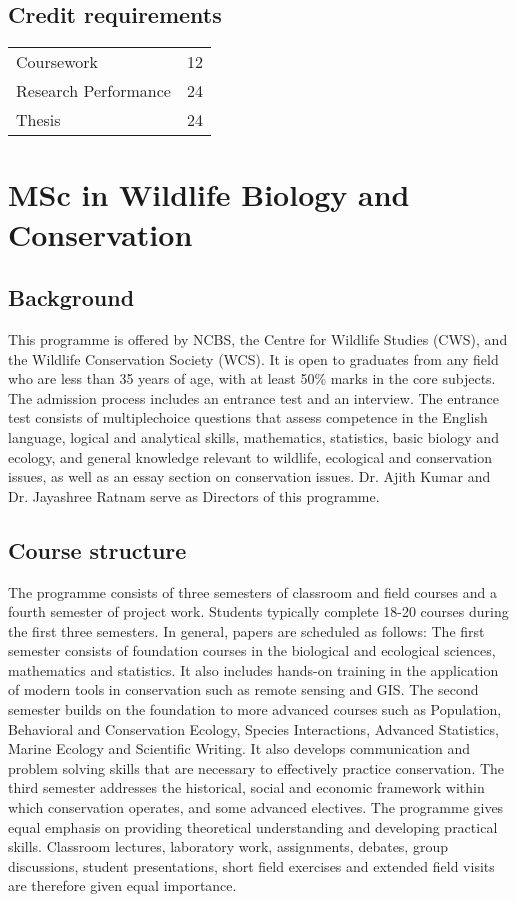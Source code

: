 \documentclass[a4paper,10pt]{article}
\begin{document}
\subsection{Credit requirements}
\begin{tabular}{l c}
    Coursework & 12 \\
    Research Performance & 24  \\
    Thesis & 24  \\
\end{tabular}

\section{MSc in Wildlife Biology and Conservation}

\subsection{Background}
This programme is offered by NCBS, the Centre for Wildlife Studies (CWS),
and the Wildlife Conservation Society (WCS). It is open to graduates from any field who are
less than 35 years of age, with at least 50\% marks in the core subjects. The admission
process includes an entrance test and an interview. The entrance test consists of multiplechoice questions that assess competence in the English language, logical and analytical
skills, mathematics, statistics, basic biology and ecology, and general knowledge relevant to
wildlife, ecological and conservation issues, as well as an essay section on conservation
issues. Dr. Ajith Kumar and Dr. Jayashree Ratnam serve as Directors of this programme.

\subsection{Course structure} The programme consists of three semesters of classroom and field
courses and a fourth semester of project work. Students typically complete 18-20 courses
during the first three semesters. In general, papers are scheduled as follows: The first
semester consists of foundation courses in the biological and ecological sciences,
mathematics and statistics. It also includes hands-on training in the application of modern
tools in conservation such as remote sensing and GIS. The second semester builds on the
foundation to more advanced courses such as Population, Behavioral and Conservation
Ecology, Species Interactions, Advanced Statistics, Marine Ecology and Scientific Writing.
It also develops communication and problem solving skills that are necessary to effectively
practice conservation. The third semester addresses the historical, social and economic
framework within which conservation operates, and some advanced electives. The
programme gives equal emphasis on providing theoretical understanding and developing
practical skills. Classroom lectures, laboratory work, assignments, debates, group
discussions, student presentations, short field exercises and extended field visits are
therefore given equal importance.
\end{document}
